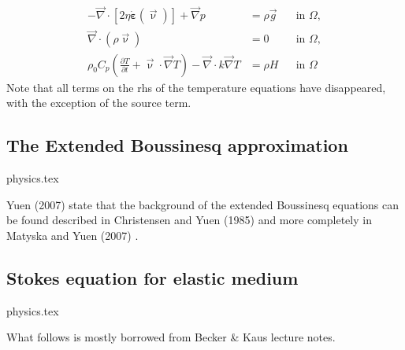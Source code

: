 \begin{align}
  \label{eq:stokes-1}
  -\vec\nabla \cdot \left[2\eta \dot{\bm \varepsilon}(\vec\upnu)
                \right] + \vec\nabla p &=
  \rho \vec{g}
  &
  & \textrm{in $\Omega$},
  \\
  \label{eq:stokes-2}
  \vec\nabla \cdot (\rho \vec\upnu) &= 0
  &
  & \textrm{in $\Omega$},
  \\
  \label{eq:temperature}
  \rho_0 C_p \left(\frac{\partial T}{\partial t} + \vec\upnu \cdot\vec\nabla T\right)
  - \vec\nabla\cdot k\vec\nabla T
  &=
  \rho H
  &
  & \textrm{in $\Omega$}
\end{align}
Note that all terms on the rhs of the temperature equations have disappeared, with the exception 
of the source term.


\subsection{The Extended Boussinesq approximation}
\begin{flushright} {\tiny {\color{gray} physics.tex}} \end{flushright}

Yuen \etal (2007) \cite{yumc07} state that the background of the extended Boussinesq 
equations can be found described in 
Christensen and Yuen (1985) \cite{chyu85} and more completely in Matyska and Yuen (2007) \cite{mayu07}.

\Literature \cite{hayk91,hayk93}

\newpage
\subsection{Stokes equation for elastic medium}
\begin{flushright} {\tiny {\color{gray} physics.tex}} \end{flushright}

What follows is mostly borrowed from Becker \& Kaus lecture notes.


